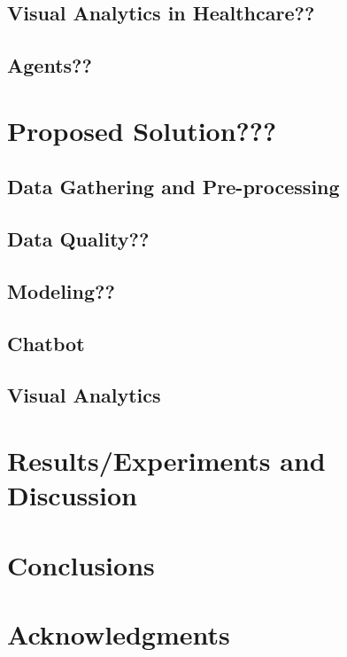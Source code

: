 \documentclass[sigconf,natbib=false]{acmart}
\begin{document}



\subsection{Visual Analytics in Healthcare??}


\subsection{Agents??}


\section{Proposed Solution???}
\label{sec:solution}


\subsection{Data Gathering and Pre-processing}

\subsection{Data Quality??}

\subsection{Modeling??}


\subsection{Chatbot}


\subsection{Visual Analytics}



\section{Results/Experiments and Discussion}
\label{sec:results}



\section{Conclusions}
\label{sec:conclusions}




\section*{Acknowledgments}

\printbibliography[title={References}]
\end{document}
